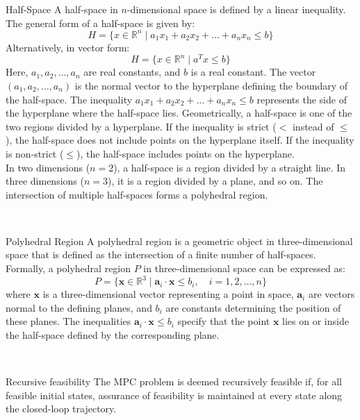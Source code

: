 \begin{definition}{Half-Space}
	A half-space in \(n\)-dimensional space is defined by a linear inequality. The general form of a half-space is given by:
	\begin{equation}
		H = \{x \in \mathbb{R}^n \mid a_1x_1 + a_2x_2 + \ldots + a_nx_n \leq b\}
	\end{equation}
	Alternatively, in vector form:
	\begin{equation}
		H = \{x \in \mathbb{R}^n \mid a^Tx \leq b\}
	\end{equation}
	Here, \(a_1, a_2, \ldots, a_n\) are real constants, and \(b\) is a real constant. The vector \((a_1, a_2, \ldots, a_n)\) is the normal vector to the hyperplane defining the boundary of the half-space. The inequality \(a_1x_1 + a_2x_2 + \ldots + a_nx_n \leq b\) represents the side of the hyperplane where the half-space lies.
	Geometrically, a half-space is one of the two regions divided by a hyperplane. If the inequality is strict (\(<\) instead of \(\leq\)), the half-space does not include points on the hyperplane itself. If the inequality is non-strict (\(\leq\)), the half-space includes points on the hyperplane. \\
	In two dimensions (\(n = 2\)), a half-space is a region divided by a straight line. In three dimensions (\(n = 3\)), it is a region divided by a plane, and so on. The intersection of multiple half-spaces forms a polyhedral region.
\end{definition}\\



\begin{definition}{Polyhedral Region}
	A polyhedral region is a geometric object in three-dimensional space that is defined as the intersection of a finite number of half-spaces. 
	Formally, a polyhedral region \(P\) in three-dimensional space can be expressed as:
	\[ P = \{ \mathbf{x} \in \mathbb{R}^3 \mid \mathbf{a}_i \cdot \mathbf{x} \leq b_i, \quad i = 1, 2, \ldots, n \} \]
	where \(\mathbf{x}\) is a three-dimensional vector representing a point in space, \(\mathbf{a}_i\) are vectors normal to the defining planes, and \(b_i\) are constants determining the position of these planes. The inequalities \(\mathbf{a}_i \cdot \mathbf{x} \leq b_i\) specify that the point \(\mathbf{x}\) lies on or inside the half-space defined by the corresponding plane.
\end{definition}\\

\begin{definition}{Recursive feasibility}
	The MPC problem is deemed recursively feasible if, for all feasible initial states, assurance of feasibility is maintained at every state along the closed-loop trajectory.
\end{definition}\\

